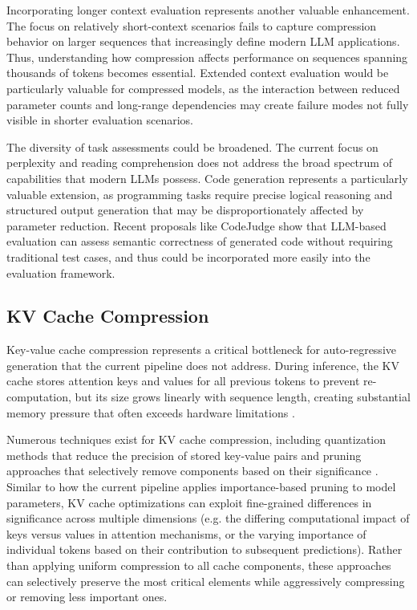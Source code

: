 Incorporating longer context evaluation represents another valuable enhancement. The focus on relatively short-context scenarios fails to capture compression behavior on larger sequences that increasingly define modern LLM applications. Thus, understanding how compression affects performance on sequences spanning thousands of tokens becomes essential. Extended context evaluation would be particularly valuable for compressed models, as the interaction between reduced parameter counts and long-range dependencies may create failure modes not fully visible in shorter evaluation scenarios.

The diversity of task assessments could be broadened. The current focus on perplexity and reading comprehension does not address the broad spectrum of capabilities that modern LLMs possess. Code generation represents a particularly valuable extension, as programming tasks require precise logical reasoning and structured output generation that may be disproportionately affected by parameter reduction. Recent proposals like CodeJudge \cite{codejudge} show that LLM-based evaluation can assess semantic correctness of generated code without requiring traditional test cases, and thus could be incorporated more easily into the evaluation framework.

\subsection{KV Cache Compression}
Key-value cache compression represents a critical bottleneck for auto-regressive generation that the current pipeline does not address. During inference, the KV cache stores attention keys and values for all previous tokens to prevent re-computation, but its size grows linearly with sequence length, creating substantial memory pressure that often exceeds hardware limitations \cite{kvcompr}.

Numerous techniques exist for KV cache compression, including quantization methods that reduce the precision of stored key-value pairs and pruning approaches that selectively remove components based on their significance \cite{kvcompr2}. Similar to how the current pipeline applies importance-based pruning to model parameters, KV cache optimizations can exploit fine-grained differences in significance across multiple dimensions (e.g. the differing computational impact of keys versus values in attention mechanisms, or the varying importance of individual tokens based on their contribution to subsequent predictions). Rather than applying uniform compression to all cache components, these approaches can selectively preserve the most critical elements while aggressively compressing or removing less important ones.


